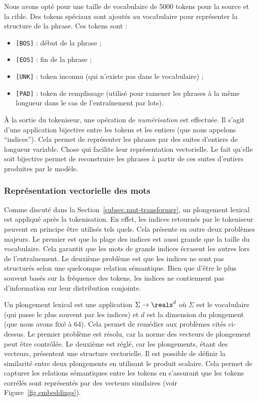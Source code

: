 Nous avons opté pour une taille de vocabulaire de 5000 tokens pour la source et la cible.
Des tokens spéciaux sont ajoutés au vocabulaire pour représenter la structure de la phrase.
Ces tokens sont :
\begin{itemize}
    \item \texttt{[BOS]} : début de la phrase ;
    \item \texttt{[EOS]} : fin de la phrase ;
    \item \texttt{[UNK]} : token inconnu (qui n'existe pas dans le vocabulaire) ;
    \item \texttt{[PAD]} : token de remplissage (utilisé pour ramener les phrases à la même longueur 
    dans le cas de l'entraînement par lots).
\end{itemize}

À la sortie du tokeniseur, une opération de \emph{numérisation} est effectuée.
Il s'agit d'une application bijective entre les tokens et les entiers (que nous appelons ``indices'').
Cela permet de représenter les phrases par des suites d'entiers de longueur variable.
Chose qui facilite leur représentation vectorielle.
Le fait qu'elle soit bijective permet de reconstruire les phrases 
à partir de ces suites d'entiers produites par le modèle.

\subsubsection{Représentation vectorielle des mots}

Comme discuté dans la Section~\ref{subsec.nmt-transformer},
un plongement lexical est appliqué après la tokenisation.
En effet, les indices retournés par le tokeniseur peuvent en principe être utilisés tels quels.
Cela présente en outre deux problèmes majeurs.
Le premier est que la plage des indices est aussi grande que la taille du vocabulaire.
Cela garantit que les mots de grands indices écrasent les autres lors de l'entraînement.
Le deuxième problème est que les indices ne sont pas structurés selon une quelconque relation sémantique.
Bien que d'être le plus souvent basés sur la fréquence des tokens, 
les indices ne contiennent pas d'information sur leur distribution conjointe.

Un plongement lexical est une application \(\Sigma \to \reals^d\) où \(\Sigma\) est le vocabulaire 
(qui passe le plus souvent par les indices) et \(d\) est la dimension du plongement (que nous avons fixé à 64).
Cela permet de remédier aux problèmes cités ci-dessus.
Le premier problème est résolu, car la norme des vecteurs de plongement peut être contrôlée.
Le deuxième est réglé, car les plongements, étant des vecteurs, présentent une structure vectorielle.
Il est possible de définir la similarité entre deux plongements en utilisant le produit scalaire.
Cela permet de capturer les relations sémantiques entre les tokens en s'assurant que les tokens corrélés
sont représentés par des vecteurs similaires (voir Figure~\ref{fig.embeddings}).

